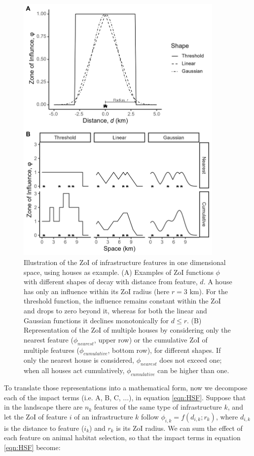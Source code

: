 \documentclass[titlepage]{article}
\begin{document}
\begin{figure}[!htbp]
\centering
\includegraphics[width=0.9\textwidth]{figures/ZoI_conceptual_new.png}
\caption{\label{fig:zoi_conceptual} Illustration of the ZoI of infrastructure features in one dimensional space, using houses as example. (A) Examples of ZoI functions $\phi$ with different shapes of decay with distance from feature, $d$. A house has only an influence within its ZoI radius (here $r = 3 \text{ km}$). For the threshold function, the influence remains constant within the ZoI and drops to zero beyond it, whereas for both the linear and Gaussian functions it declines monotonically for $d \leq r$. 
(B) Representation of the ZoI of multiple houses by considering only the nearest feature ($\phi_{nearest}$, upper row) or the cumulative ZoI of multiple features ($\phi_{cumulative}$, bottom row), for different shapes. If only the nearest house is considered, $\phi_{nearest}$ does not exceed one; when all houses act cumulatively, $\phi_{cumulative}$ can be higher than one.}
\end{figure}

To translate those representations into a mathematical form, now we decompose each of the impact terms (i.e. A, B, C, ...), in equation \ref{eqn:HSF}. Suppose that in the landscape there are $n_k$ features of the same type of infrastructure $k$, and let the ZoI of feature $i$ of an infrastructure $k$ follow $\phi_{i,k} = f(d_{i,k}; r_k)$, where $d_{i,k}$ is the distance to feature ($i_k$) and $r_k$ is its ZoI radius. We can sum the effect of each feature on animal habitat selection, so that the impact terms in equation \ref{eqn:HSF} become:
\end{document}
